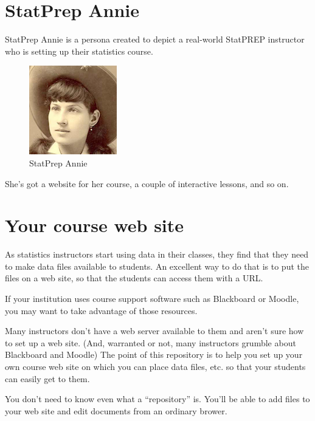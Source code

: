\documentclass[]{book}
\theoremstyle{definition}
\theoremstyle{definition}
\theoremstyle{definition}
\theoremstyle{remark}
\begin{document}
\chapter{StatPrep Annie}\label{statprep-annie}

StatPrep Annie is a persona created to depict a real-world StatPREP
instructor who is setting up their statistics course.

\begin{figure}

{\centering \includegraphics{images/Annie-thumbnail} 

}

\caption{StatPrep Annie}\label{fig:unnamed-chunk-1}
\end{figure}

She's got a website for her course, a couple of interactive lessons, and
so on.

\chapter{Your course web site}\label{your-course-web-site}

As statistics instructors start using data in their classes, they find
that they need to make data files available to students. An excellent
way to do that is to put the files on a web site, so that the students
can access them with a URL.

If your institution uses course support software such as Blackboard or
Moodle, you may want to take advantage of those resources.

Many instructors don't have a web server available to them and aren't
sure how to set up a web site. (And, warranted or not, many instructors
grumble about Blackboard and Moodle) The point of this repository is to
help you set up your own course web site on which you can place data
files, etc. so that your students can easily get to them.

You don't need to know even what a ``repository'' is. You'll be able to
add files to your web site and edit documents from an ordinary brower.
\end{document}
